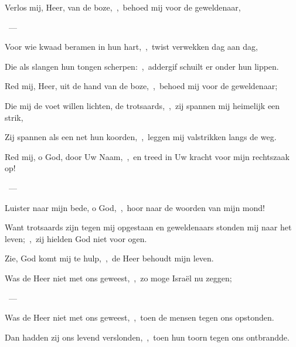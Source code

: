 \documentclass[12pt,twoside,a5paper]{article}
\begin{document}
\begin{halfparskip}
    Verlos mij, Heer, van de boze,~\sep\ behoed mij voor de geweldenaar,

  ~--- 

  Voor wie kwaad beramen in hun hart,~\sep\ twist verwekken dag aan dag,

  Die als slangen hun tongen scherpen:~\sep\ addergif schuilt er onder hun lippen.

  Red mij, Heer, uit de hand van de boze,~\sep\ behoed mij voor de geweldenaar;

  Die mij de voet willen lichten, de trotsaards,~\sep\ zij spannen mij heimelijk een strik,

  Zij spannen als een net hun koorden,~\sep\ leggen mij valstrikken langs de weg.
\end{halfparskip}

\begin{halfparskip}
    Red mij, o God, door Uw Naam,~\sep\ en treed in Uw kracht voor mijn rechtszaak op!

  ~--- 

  Luister naar mijn bede, o God,~\sep\ hoor naar de woorden van mijn mond!

  Want trotsaards zijn tegen mij opgestaan en geweldenaars stonden mij naar het leven;~\sep\ zij hielden God niet voor ogen.

  Zie, God komt mij te hulp,~\sep\ de Heer behoudt mijn leven.
\end{halfparskip}

\begin{halfparskip}
    Was de Heer niet met ons geweest,~\sep\ zo moge Israël nu zeggen;

  ~--- 

  Was de Heer niet met ons geweest,~\sep\ toen de mensen tegen ons opstonden.

  Dan hadden zij ons levend verslonden,~\sep\ toen hun toorn tegen ons ontbrandde.
\end{halfparskip}
\end{document}

